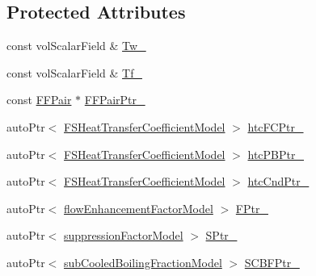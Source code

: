 \subsection*{Protected Attributes}
\begin{DoxyCompactItemize}
\item 
const vol\+Scalar\+Field \& \hyperlink{classFoam_1_1FSHeatTransferCoefficientModels_1_1multiRegimeBoiling_ae9fe0c2c0680b9be8e8b857242026717}{Tw\+\_\+}
\item 
const vol\+Scalar\+Field \& \hyperlink{classFoam_1_1FSHeatTransferCoefficientModels_1_1multiRegimeBoiling_af142f541f24bec13980e7975746111fd}{Tf\+\_\+}
\item 
const \hyperlink{classFoam_1_1FFPair}{F\+F\+Pair} $\ast$ \hyperlink{classFoam_1_1FSHeatTransferCoefficientModels_1_1multiRegimeBoiling_adca848d730733f4692fbd95dfea33c54}{F\+F\+Pair\+Ptr\+\_\+}
\item 
auto\+Ptr$<$ \hyperlink{classFoam_1_1FSHeatTransferCoefficientModel}{F\+S\+Heat\+Transfer\+Coefficient\+Model} $>$ \hyperlink{classFoam_1_1FSHeatTransferCoefficientModels_1_1multiRegimeBoiling_adf8ce3cd4d7519ffb8797dd90637f5ac}{htc\+F\+C\+Ptr\+\_\+}
\item 
auto\+Ptr$<$ \hyperlink{classFoam_1_1FSHeatTransferCoefficientModel}{F\+S\+Heat\+Transfer\+Coefficient\+Model} $>$ \hyperlink{classFoam_1_1FSHeatTransferCoefficientModels_1_1multiRegimeBoiling_aa72a4e83a5f780166b4b0302bc8d3f65}{htc\+P\+B\+Ptr\+\_\+}
\item 
auto\+Ptr$<$ \hyperlink{classFoam_1_1FSHeatTransferCoefficientModel}{F\+S\+Heat\+Transfer\+Coefficient\+Model} $>$ \hyperlink{classFoam_1_1FSHeatTransferCoefficientModels_1_1multiRegimeBoiling_a2d09dd01d38897d05040952ea5d2959e}{htc\+Cnd\+Ptr\+\_\+}
\item 
auto\+Ptr$<$ \hyperlink{classFoam_1_1flowEnhancementFactorModel}{flow\+Enhancement\+Factor\+Model} $>$ \hyperlink{classFoam_1_1FSHeatTransferCoefficientModels_1_1multiRegimeBoiling_aa4c7b43d4957bed6a0bcdfb511d05789}{F\+Ptr\+\_\+}
\item 
auto\+Ptr$<$ \hyperlink{classFoam_1_1suppressionFactorModel}{suppression\+Factor\+Model} $>$ \hyperlink{classFoam_1_1FSHeatTransferCoefficientModels_1_1multiRegimeBoiling_a50ec1152102f6d0ac7630cde373de172}{S\+Ptr\+\_\+}
\item 
auto\+Ptr$<$ \hyperlink{classFoam_1_1subCooledBoilingFractionModel}{sub\+Cooled\+Boiling\+Fraction\+Model} $>$ \hyperlink{classFoam_1_1FSHeatTransferCoefficientModels_1_1multiRegimeBoiling_ac9f716850c8561763e061760b8bafdac}{S\+C\+B\+F\+Ptr\+\_\+}

\end{DoxyCompactItemize}
